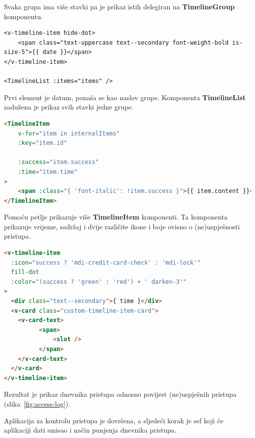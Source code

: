 Svaka grupa ima više stavki pa je prikaz istih delegiran na \textbf{TimelineGroup} komponentu.

\begin{lstlisting}
<v-timeline-item hide-dot>
    <span class="text-uppercase text--secondary font-weight-bold is-size-5">{{ date }}</span>
</v-timeline-item>

<TimelineList :items="items" />
\end{lstlisting}

Prvi element je datum, ponaša se kao naslov grupe.
Komponenta \textbf{TimelineList} zadužena je prikaz svih stavki jedne grupe.

\begin{lstlisting}[language=HTML]
<TimelineItem
    v-for="item in internalItems"
    :key="item.id"

    :success="item.success"
    :time="item.time"
>
    <span :class="{ 'font-italic': !item.success }">{{ item.content }}</span>
</TimelineItem>
\end{lstlisting}

Pomoću petlje prikazuje više \textbf{TimelineItem} komponenti.
Ta komponenta prikazuje vrijeme, sadržaj i dvije različite ikone i boje ovisno o (ne)uspješnosti pristupa.

\begin{lstlisting}[language=HTML]
<v-timeline-item
  :icon="success ? 'mdi-credit-card-check' : 'mdi-lock'"
  fill-dot
  :color="(success ? 'green' : 'red') + ' darken-3'"
>
  <div class="text--secondary">{ time }</div>
  <v-card class="custom-timeline-item-card">
    <v-card-text>
          <span>
              <slot />
          </span>
    </v-card-text>
  </v-card>
</v-timeline-item>
\end{lstlisting}

Rezultat je prikaz dnevnika pristupa odnosno povijest (ne)uspješnih pristupa (slika~\ref{fig:access-log}).

Aplikacija za kontrolu pristupa je dovršena, a sljedeći korak je sef koji će aplikaciji dati smisao i način punjenja
dnevnika pristupa.
